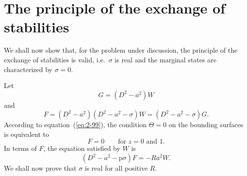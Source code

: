 \section{The principle of the exchange of stabilities}\label{sec:11}

We shall now show that, for the problem under discussion, the principle
of the exchange of stabilities is valid, i.e.\ $\sigma$ is real and the marginal states
are characterized by $\sigma = 0$.

Let
\begin{equation}
\label{eq:2-112}
G = (D^2 - a^2)W
\end{equation}
and
\begin{equation}
\label{eq:2-113}
F = (D^2-a^2)(D^2-a^2-\sigma)W = (D^2-a^2-\sigma)G.
\end{equation}
According to equation~(\ref{eq:2-99}), the condition $\Theta = 0$ on the bounding
surfaces is equivalent to
\begin{equation}
\label{eq:2-114}
F = 0 \qquad\text{for } z = 0 \text{ and } 1.
\end{equation}
In terms of $F$, the equation satisfied by $W$ is
\begin{equation}
\label{eq:2-115}
(D^2-a^2-\mathrm{p}\sigma)F = -Ra^2 W.
\end{equation}
We shall now prove that $\sigma$ is real for all positive $R$.

